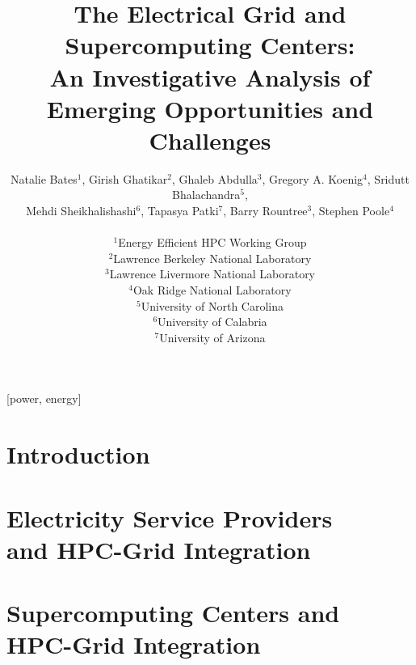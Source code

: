 \documentclass{../style/sig-alternate}
\begin{document}
%

\title{
The Electrical Grid and Supercomputing Centers:\\
An Investigative Analysis of Emerging Opportunities and Challenges
}

\author{Natalie Bates$^1$, Girish Ghatikar$^2$,
  Ghaleb Abdulla$^3$, Gregory A. Koenig$^4$, Sridutt Bhalachandra$^5$, \\
	Mehdi Sheikhalishashi$^6$, Tapasya Patki$^7$, Barry Rountree$^3$, Stephen Poole$^4$
	\\ \\
	$^1$Energy Efficient HPC Working Group\\
       $^2$Lawrence Berkeley National Laboratory\\
       $^3$Lawrence Livermore National Laboratory\\
			 $^4$Oak Ridge National Laboratory\\
			 $^5$University of North Carolina\\
			$^6$University of Calabria\\
			$^7$University of Arizona
	}

\maketitle              %


[power, energy]



%
\section{Introduction}
\label{sec:intro}


\section{Electricity Service Providers\\
 and HPC-Grid Integration}
\label{sec:ESPintegration}


\section{Supercomputing Centers and \\ HPC-Grid Integration}
\label{sec:supercomputercenters}

\end{document}

